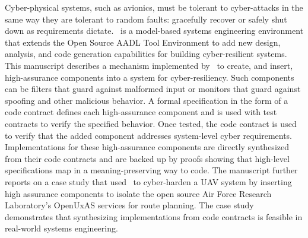 Cyber-physical systems, such as avionics, must be tolerant to
cyber-attacks in the same way they are tolerant to random faults: gracefully recover or safely shut down as requirements dictate.
\brfcs\ is a model-based systems engineering environment that extends the Open Source AADL Tool Environment to add new design, analysis, and code generation capabilities for building cyber-resilient systems.
This manuscript describes a mechanism implemented by \brfcs\ to create, and insert, high-assurance components into a system for cyber-resiliency.
Such components can be filters that guard against malformed input or monitors that guard against spoofing and other malicious behavior.
A formal specification in the form of a code contract defines each high-assurance component and is used with test contracts to verify the specified behavior.
Once tested, the code contract is used to verify that the added component addresses system-level cyber requirements.
Implementations for these
high-assurance components are directly synthesized from their code
contracts and are backed up by proofs showing that high-level
specifications map in a meaning-preserving way to code.
The manuscript further reports on a case study that used \brfcs\ to cyber-harden a UAV system by inserting high assurance components to isolate the open source Air Force Research Laboratory's OpenUxAS services for
route planning.  The case study
demonstrates that synthesizing implementations from code contracts is feasible in real-world systems
engineering.

